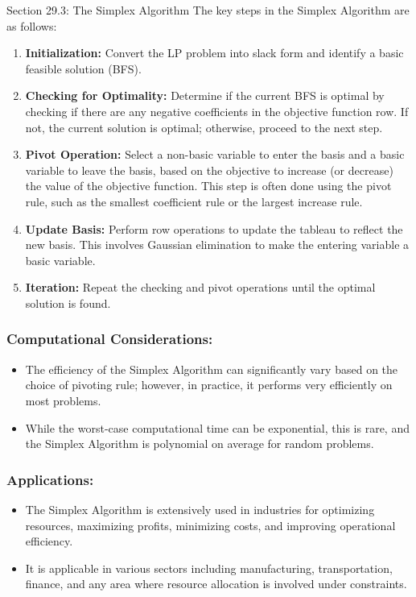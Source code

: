 \begin{notes}{Section 29.3: The Simplex Algorithm}
    The key steps in the Simplex Algorithm are as follows:
    \begin{enumerate}
        \item \textbf{Initialization:} Convert the LP problem into slack form and identify a basic feasible solution (BFS).
        \item \textbf{Checking for Optimality:} Determine if the current BFS is optimal by checking if there are any negative coefficients in the objective function row. If not, the current solution 
        is optimal; otherwise, proceed to the next step.
        \item \textbf{Pivot Operation:} Select a non-basic variable to enter the basis and a basic variable to leave the basis, based on the objective to increase (or decrease) the value of the 
        objective function. This step is often done using the pivot rule, such as the smallest coefficient rule or the largest increase rule.
        \item \textbf{Update Basis:} Perform row operations to update the tableau to reflect the new basis. This involves Gaussian elimination to make the entering variable a basic variable.
        \item \textbf{Iteration:} Repeat the checking and pivot operations until the optimal solution is found.
    \end{enumerate}
    
    \subsubsection*{Computational Considerations:}
    
    \begin{itemize}
        \item The efficiency of the Simplex Algorithm can significantly vary based on the choice of pivoting rule; however, in practice, it performs very efficiently on most problems.
        \item While the worst-case computational time can be exponential, this is rare, and the Simplex Algorithm is polynomial on average for random problems.
    \end{itemize}
    
    \subsubsection*{Applications:}
    
    \begin{itemize}
        \item The Simplex Algorithm is extensively used in industries for optimizing resources, maximizing profits, minimizing costs, and improving operational efficiency.
        \item It is applicable in various sectors including manufacturing, transportation, finance, and any area where resource allocation is involved under constraints.
    \end{itemize}
    

\end{notes}

